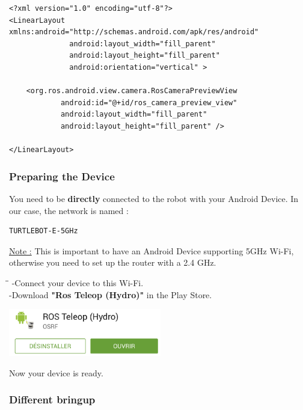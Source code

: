 \documentclass[10pt,a4paper]{article}
\begin{document}
\begin{lstlisting}[frame=single]
<?xml version="1.0" encoding="utf-8"?>
<LinearLayout xmlns:android="http://schemas.android.com/apk/res/android"
              android:layout_width="fill_parent"
              android:layout_height="fill_parent"
              android:orientation="vertical" >

    <org.ros.android.view.camera.RosCameraPreviewView
            android:id="@+id/ros_camera_preview_view"
            android:layout_width="fill_parent"
            android:layout_height="fill_parent" />

</LinearLayout>
\end{lstlisting}

\subsubsection{Preparing the Device}
You need to be \textbf{directly} connected to the robot with your Android Device. In our case, the network is named : 
\begin{lstlisting}[frame=single]
TURTLEBOT-E-5GHz
\end{lstlisting}

\underline{Note :} This is important to have an Android Device supporting 5GHz Wi-Fi, otherwise you need to set up the router with a 2.4 GHz.\\

\begin{tabbing}
\hspace{1cm}\=\hspace{1cm}\=\kill
\> -Connect your device to this Wi-Fi.\\
\> -Download \textbf{"Ros Teleop (Hydro)"} in the Play Store.\\
\end{tabbing}

\begin{center}
\includegraphics[width=0.5\textwidth]{images/turtlebotTeleopApp.png}
\end{center}

Now your device is ready.

\subsubsection{Different bringup}
\end{document}
